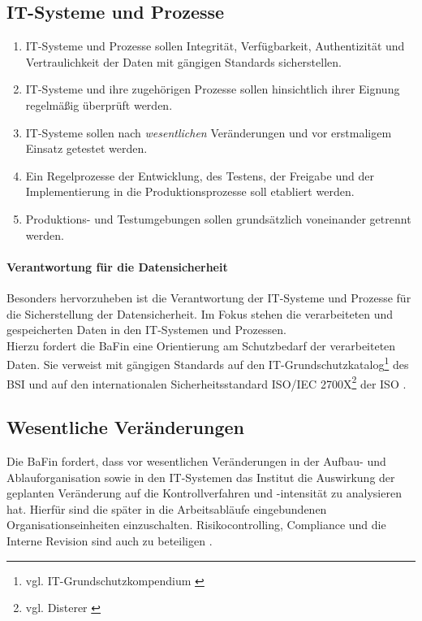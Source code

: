 \subsection{IT-Systeme und Prozesse}
\begin{enumerate}
    \item IT-Systeme und Prozesse sollen Integrität, Verfügbarkeit, Authentizität und Vertraulichkeit der Daten mit gängigen Standards sicherstellen.
    \item IT-Systeme und ihre zugehörigen Prozesse sollen hinsichtlich ihrer Eignung regelmäßig überprüft werden.
    \item IT-Systeme sollen nach \emph{wesentlichen} Veränderungen und vor erstmaligem Einsatz getestet werden.
    \item Ein Regelprozesse der Entwicklung, des Testens, der Freigabe und der Implementierung in die Produktionsprozesse soll etabliert werden. 
    \item Produktions- und Testumgebungen sollen grundsätzlich voneinander getrennt werden.
\end{enumerate}
%
\paragraph{Verantwortung für die Datensicherheit}
Besonders hervorzuheben ist die Verantwortung der IT-Systeme und Prozesse für die Sicherstellung der Datensicherheit.  Im Fokus stehen die verarbeiteten und gespeicherten Daten in den IT-Systemen und Prozessen.
\medskip
\\
Hierzu fordert die BaFin eine Orientierung am Schutzbedarf der verarbeiteten Daten. Sie verweist mit gängigen Standards auf den IT-Grundschutzkatalog\footnote{vgl. IT-Grundschutzkompendium \cite{IT-Grundschutz:2020}} des \ac{BSI} und auf den internationalen Sicherheitsstandard ISO/IEC 2700X\footnote{vgl. Disterer \cite{Disterer2013}} der \ac{ISO} \cite{MaRisk:2017, MaRiskErläuterungen:2017}.

\subsection{Wesentliche Veränderungen}
Die BaFin fordert, dass vor wesentlichen Veränderungen in der Aufbau- und Ablauforganisation sowie in den IT-Systemen das Institut die Auswirkung der geplanten Veränderung auf die Kontrollverfahren und -intensität zu analysieren hat. Hierfür sind die später in die Arbeitsabläufe eingebundenen Organisationseinheiten einzuschalten. Risikocontrolling, Compliance und die Interne Revision sind auch zu beteiligen \cite{MaRisk:2017}. 
%
